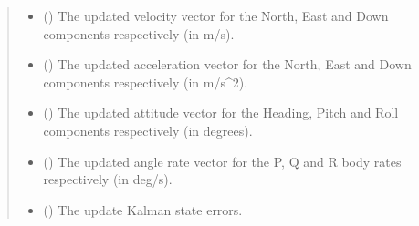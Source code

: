 \documentclass[letterpaper,10pt,english]{sphinxmanual}
\begin{document}
\begin{fulllineitems}
\begin{fulllineitems}
\begin{quote}
\begin{description}
\begin{itemize}
\item {} 
\sphinxAtStartPar
{} (\sphinxstyleliteralemphasis{\sphinxupquote{ (}}\sphinxstyleliteralemphasis{\sphinxupquote{)}}) \textendash{} The updated velocity vector for the
North, East and Down components respectively (in m/s).

\item {} 
\sphinxAtStartPar
{} (\sphinxstyleliteralemphasis{\sphinxupquote{ (}}\sphinxstyleliteralemphasis{\sphinxupquote{)}}) \textendash{} The updated acceleration vector for
the North, East and Down components respectively (in m/s\textasciicircum{}2).

\item {} 
\sphinxAtStartPar
{} (\sphinxstyleliteralemphasis{\sphinxupquote{ (}}\sphinxstyleliteralemphasis{\sphinxupquote{)}}) \textendash{} The updated attitude vector for the Heading,
Pitch and Roll components respectively (in degrees).

\item {} 
\sphinxAtStartPar
{} (\sphinxstyleliteralemphasis{\sphinxupquote{ (}}\sphinxstyleliteralemphasis{\sphinxupquote{)}}) \textendash{} The updated angle rate vector for the
P, Q and R body rates respectively (in deg/s).

\item {} 
\sphinxAtStartPar
{} (\sphinxstyleliteralemphasis{\sphinxupquote{ (}}\sphinxstyleliteralemphasis{\sphinxupquote{)}}) \textendash{} The update Kalman state errors.

\end{itemize}

\end{description}\end{quote}

\end{fulllineitems}


\end{fulllineitems}
\end{document}
